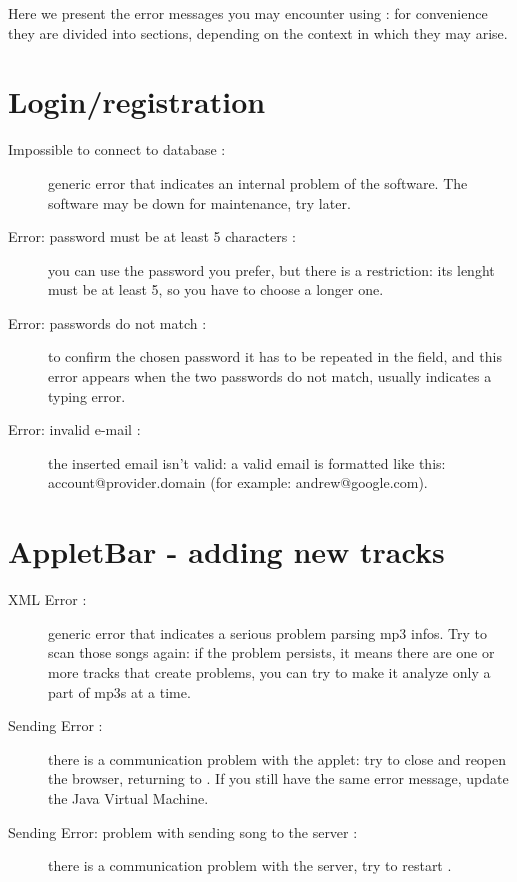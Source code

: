Here we present the error messages you may encounter using : for
convenience they are divided into sections, depending on the context in which
they may arise.
\section{Login/registration}
\begin{description}
	\item[Impossible to connect to database :] generic error that
	indicates an internal problem of the software. The software may be down for
	maintenance, try later.
	\item[Error: password must be at least 5 characters :] you can use the
	password you prefer, but there is a restriction: its lenght must be at least 5,
	so you have to choose a longer one.
	\item[Error: passwords do not match :] to confirm the
	chosen password it has to be repeated in the field, and this error appears
	when the two passwords do not match, usually indicates a typing error.
	\item[Error: invalid e-mail :] the inserted email isn't valid:
	a valid email is formatted like this: account@provider.domain (for example:
	andrew@google.com).
\end{description}

\section{AppletBar - adding new tracks}
\begin{description}
	\item [XML Error :] generic error that indicates a serious problem parsing mp3
	infos. Try to scan those songs again: if the problem persists, it means
	there are one or more tracks that create problems, you can try to make it
	analyze only a part of mp3s at a time.
	\item [Sending Error :] there is a communication problem with the applet:
	try to close and reopen the browser, returning to . If
	you still have the same error message, update the Java Virtual
	Machine.
	\item [Sending Error: problem with sending song to the server :] there is a
	communication problem with the server, try to restart .
\end{description}

